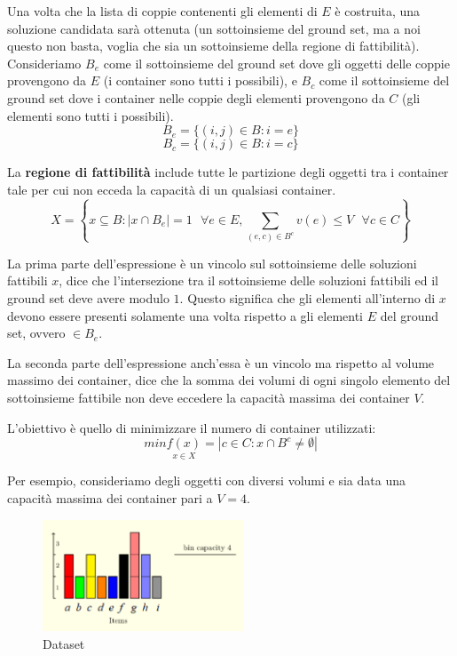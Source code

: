 \documentclass{article}
\begin{document}
Una volta che la lista di coppie contenenti gli elementi di $E$
è costruita, una soluzione candidata sarà ottenuta (un sottoinsieme del ground set,
ma a noi questo non basta, voglia che sia un sottoinsieme della regione di fattibilità).
\newline
\newline
Consideriamo $B_e$ come il sottoinsieme del ground set dove gli oggetti delle coppie provengono da $E$ (i container sono tutti i possibili), e $B_c$ come il sottoinsieme del ground set dove i container nelle coppie degli elementi provengono da $C$ (gli elementi sono tutti i possibili).
$$B_e=\{(i,j) \in B : i=e\}$$
$$B_c=\{(i,j) \in B : i=c\}$$

La \textbf{regione di fattibilità} include tutte le partizione degli oggetti tra i
container tale per cui non ecceda la capacità di un qualsiasi container.
$$X=\left\{ x\subseteq B : |x\cap B_e|=1\text{ } \forall e \in E, \sum_{(e,c) \in B^c} v(e)\leq V \text{ } \forall c\in C \right\}$$

La prima parte dell'espressione è un vincolo sul sottoinsieme delle soluzioni fattibili $x$, dice che l'intersezione tra il sottoinsieme delle soluzioni fattibili ed il ground set deve avere modulo $1$. Questo significa che gli elementi
all'interno di $x$ devono essere presenti solamente una volta rispetto a gli elementi $E$ del ground set, ovvero $\in B_e$.

La seconda parte dell'espressione anch'essa è un vincolo ma rispetto al volume massimo dei container, dice che la somma dei volumi
di ogni singolo elemento del sottoinsieme fattibile non deve eccedere la capacità massima dei container $V$.

L'obiettivo è quello di minimizzare il numero di container utilizzati:
$$min\underset{x\in X}{f(x)}=|{c \in C : x\cap B^c \neq \emptyset}|$$

Per esempio, consideriamo degli oggetti con diversi volumi e sia data una capacità massima dei container pari a $V=4$.

\begin{figure}[H]
    \centering
    \includegraphics[width=6cm]{images/grap_BPP.png}
    \caption{Dataset}
    \label{fig:grap_BPP}
\end{figure}
\end{document}
